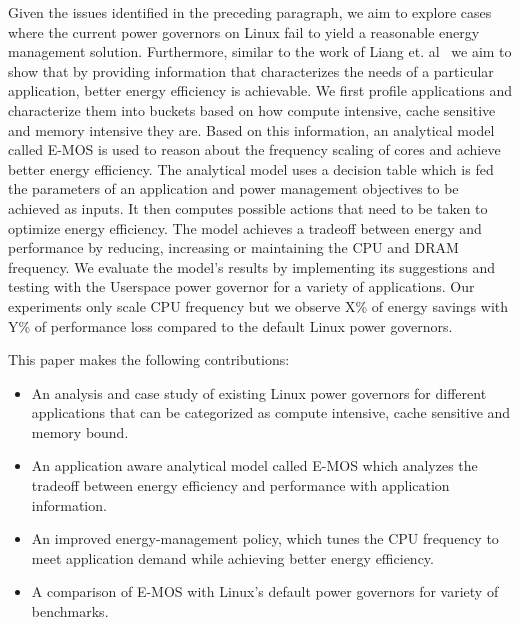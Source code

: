 Given the issues identified in the preceding paragraph, we aim to explore cases where the current power governors on Linux fail to yield a reasonable energy management solution. 
Furthermore, similar to the work of Liang et. al~\cite{and-dvfs} we aim to show that by providing information that characterizes the needs of a particular application, 
better energy efficiency is achievable. We first profile applications and characterize them into buckets based on how compute intensive, cache sensitive and memory intensive they are. 
Based on this information, an analytical model called E-MOS is used to reason about the frequency scaling of cores and achieve better energy efficiency. 
The analytical model uses a decision table which is fed the parameters of an application and power management objectives to be achieved as inputs.
It then computes possible actions that need to be taken to optimize energy efficiency.
The model achieves a tradeoff between energy and performance by reducing, increasing or maintaining the CPU and DRAM frequency. 
We evaluate the model's results by implementing its suggestions and testing with the Userspace power governor for a variety of applications. Our experiments only scale CPU frequency but we 
observe X\% of energy savings with Y\% of performance loss compared to the default Linux power governors.

This paper makes the following contributions:
\begin{itemize}
\item  An analysis and case study of existing Linux power governors for different applications that can be categorized as compute intensive, cache sensitive and memory bound. 
\item  An application aware analytical model called E-MOS which analyzes the tradeoff between energy efficiency and performance with application information.
\item  An improved energy-management policy, which tunes the CPU frequency to meet application demand while achieving better energy efficiency.
\item  A comparison of E-MOS with Linux's default power governors for variety of benchmarks.
\end{itemize}

